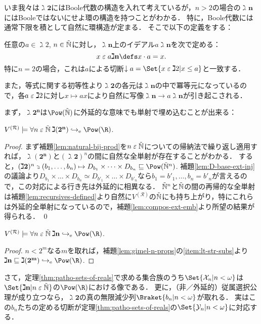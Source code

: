 \documentclass[realisability.tex]{subfiles}
\begin{document}
いま我々は$\gimel \mathbf{2}$にはBoole代数の構造を入れて考えているが，$n > 2$の場合の$\gimel \mathbf{n}$にはBooleではないにせよ環の構造を持つことがわかる．
特に，Boole代数には通常下限を積として自然に環構造が定まる．
そこで以下の定義をする：

\begin{definition}
 任意の$a \in \gimel 2$, $n \in \mathord{\tilde{\mathbb{N}}}$に対し，$\gimel \mathbf{n}$上のイデアル$a\gimel\mathbf{n}$を次で定める：
 \[
  x \strin a \gimel\mathbf{n} \defs x \cdot a = x.
 \]
 特に$n = 2$の場合，これは$a$による切断$\downarrow a = \Set{x \strin \gimel 2| x \leq a}$と一致する．

 また，等式に関する初等性より$\gimel \mathbf{2}$の各元は$\gimel \mathbf{n}$の中で冪等元になっているので，各$a \mathrel{\varepsilon} \gimel 2$に対し$x \mapsto a x$により自然に写像$\gimel \mathbf{n} \to a \gimel \mathbf{n}$が引き起こされる．
\end{definition}

まず，$\gimel \mathbf{2^n}$は$\Pow(\NN)$に外延的な意味でも単射で埋め込むことが出来る：
\begin{lemma}
 $V^{(\mathcal{R})} \models \forall n \strin \NN \: \gimel(\mathbf{2^n}) \eembto \Pow(\R)$.
\end{lemma}
\begin{proof}
 まず補題\ref{lem:natural-bij-prod}を$n \mathrel{\varepsilon} \mathord{\tilde{\mathbb{N}}}$についての帰納法で繰り返し適用すれば，$\gimel(\mathbf{2^n})$と$(\gimel \mathbf{2})^n$の間に自然な全単射が存在することがわかる．
 すると，$(\gimel\mathbf{2})^n \strni (b_1, \dots, b_n) \mapsto D_{b_1} \times \dots \times D_{b_n} \sqsubseteq \Pow(\NN^n)$.
 補題\ref{lem:D-base-ext-inj}の議論より$D_{b_1} \times \dots \times D_{b_n} \simeq D_{b'_1} \times \dots \times D_{b'_n}$なら$b_1 = b'_1, \dots, b_n = b'_n$が言えるので，この対応による行き先は外延的に相異なる．
 $\mathord{\tilde{\mathbb{N}}}^n$と$\mathord{\tilde{\mathbb{N}}}$の間の再帰的な全単射は補題\ref{lem:recursives-defined}より自然に$V^{(\mathcal{R})}$の$\mathord{\tilde{\mathbb{N}}}$にも持ち上がり，特にこれらは外延的全単射になっているので，補題\ref{lem:compos-ext-emb}より所望の結果が得られる． \qed
\end{proof}

\begin{corollary}\label{cor:gimels-ext-embeds}
 $V^{(\mathcal{R})} \models \forall n \strin \NN\: \gimel\mathbf{n} \eembto \Pow(\R)$.
\end{corollary}
\begin{proof}
 $n < 2^m$なる$m$を取れば，補題\ref{lem:gimel-n-props}の\ref{item:lt-str-subs}より$\gimel\mathbf{n} \sqsubseteq \gimel (\mathbf{2^m}) \eembto \Pow(\R)$.
\end{proof}
さて，定理\ref{thm:patho-sets-of-reals}で求める集合族のうち$\Set{\mathcal{X}_n | n < \omega}$は$\Set{\gimel \mathbf{n} | n \strin \NN}$の$\Pow(\R)$における像である．
更に，（非／外延的）従属選択公理が成り立つなら，$\gimel \mathbf{2}$の真の無限減少列$\Braket{b_n | n < \omega}$が取れる．
実はこの$b_n$たちの定める切断が定理\ref{thm:patho-sets-of-reals}の$\Set{\mathcal{Y}_n | n < \omega}$に対応する．
\end{document}
